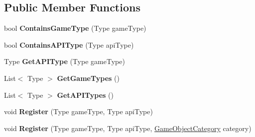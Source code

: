\subsection*{Public Member Functions}
\begin{DoxyCompactItemize}
\item 
\hypertarget{class_s_e_mod_a_p_i_internal_1_1_a_p_i_1_1_common_1_1_game_object_registry_a245eba51bd5848de47a7b77171c1e573}{}bool {\bfseries Contains\+Game\+Type} (Type game\+Type)\label{class_s_e_mod_a_p_i_internal_1_1_a_p_i_1_1_common_1_1_game_object_registry_a245eba51bd5848de47a7b77171c1e573}

\item 
\hypertarget{class_s_e_mod_a_p_i_internal_1_1_a_p_i_1_1_common_1_1_game_object_registry_a505ea2256d374f4907c05ebf5548bf61}{}bool {\bfseries Contains\+A\+P\+I\+Type} (Type api\+Type)\label{class_s_e_mod_a_p_i_internal_1_1_a_p_i_1_1_common_1_1_game_object_registry_a505ea2256d374f4907c05ebf5548bf61}

\item 
\hypertarget{class_s_e_mod_a_p_i_internal_1_1_a_p_i_1_1_common_1_1_game_object_registry_a7923f840b85041db99c1f92e2b441bf7}{}Type {\bfseries Get\+A\+P\+I\+Type} (Type game\+Type)\label{class_s_e_mod_a_p_i_internal_1_1_a_p_i_1_1_common_1_1_game_object_registry_a7923f840b85041db99c1f92e2b441bf7}

\item 
\hypertarget{class_s_e_mod_a_p_i_internal_1_1_a_p_i_1_1_common_1_1_game_object_registry_a1d9f7c6e295cccee4e10293cef8f56b6}{}List$<$ Type $>$ {\bfseries Get\+Game\+Types} ()\label{class_s_e_mod_a_p_i_internal_1_1_a_p_i_1_1_common_1_1_game_object_registry_a1d9f7c6e295cccee4e10293cef8f56b6}

\item 
\hypertarget{class_s_e_mod_a_p_i_internal_1_1_a_p_i_1_1_common_1_1_game_object_registry_af8ca8e8a87b28d560805dfbf481334b3}{}List$<$ Type $>$ {\bfseries Get\+A\+P\+I\+Types} ()\label{class_s_e_mod_a_p_i_internal_1_1_a_p_i_1_1_common_1_1_game_object_registry_af8ca8e8a87b28d560805dfbf481334b3}

\item 
\hypertarget{class_s_e_mod_a_p_i_internal_1_1_a_p_i_1_1_common_1_1_game_object_registry_abb8aeb828ad552a838c870f75ea8f7a6}{}void {\bfseries Register} (Type game\+Type, Type api\+Type)\label{class_s_e_mod_a_p_i_internal_1_1_a_p_i_1_1_common_1_1_game_object_registry_abb8aeb828ad552a838c870f75ea8f7a6}

\item 
\hypertarget{class_s_e_mod_a_p_i_internal_1_1_a_p_i_1_1_common_1_1_game_object_registry_aed2c1d5d63ffcf00bae52a4fec7ef8b7}{}void {\bfseries Register} (Type game\+Type, Type api\+Type, \hyperlink{struct_s_e_mod_a_p_i_internal_1_1_a_p_i_1_1_common_1_1_game_object_category}{Game\+Object\+Category} category)\label{class_s_e_mod_a_p_i_internal_1_1_a_p_i_1_1_common_1_1_game_object_registry_aed2c1d5d63ffcf00bae52a4fec7ef8b7}


\end{DoxyCompactItemize}
